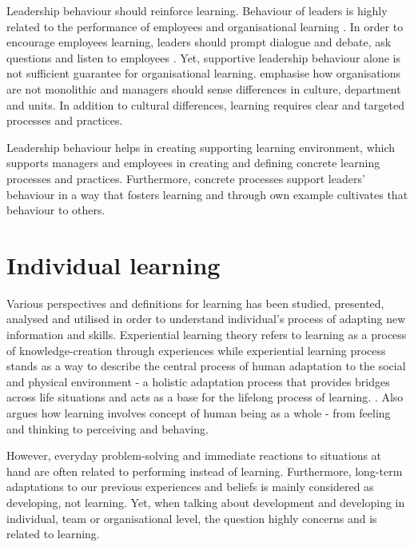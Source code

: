 Leadership behaviour should reinforce learning. Behaviour of leaders is highly related to the performance of employees \citep{kim2014blue} and organisational learning \citep{garvin2008yours}. In order to encourage employees learning, leaders should prompt dialogue and debate, ask questions and listen to employees \citep{kim2014blue,garvin2008yours}. Yet, supportive leadership behaviour alone is not sufficient guarantee for organisational learning. \citet{garvin2008yours}emphasise how organisations are not monolithic and managers should sense differences in culture, department and units. In addition to cultural differences, learning requires clear and targeted processes and practices. 

Leadership behaviour helps in creating supporting learning environment, which supports managers and employees in creating and defining concrete learning processes and practices. Furthermore, concrete processes support leaders' behaviour in a way that fosters learning and through own example cultivates that behaviour to others. \citep{garvin2008yours}

\section{Individual learning} \label{individual}
Various perspectives and definitions for learning has been studied, presented, analysed and utilised in order to understand individual's process of adapting new information and skills. Experiential learning theory refers to learning as a process of knowledge-creation through experiences while experiential learning process stands as a way to describe the central process of human adaptation to the social and physical environment - a holistic adaptation process that provides bridges across life situations and acts as a base for the lifelong process of learning. \citep{kolb1984experiential}. Also \citet{jung1923psychological} argues how learning involves concept of human being as a whole - from feeling and thinking to perceiving and behaving.

However, everyday problem-solving and immediate reactions to situations at hand are often related to performing instead of learning. Furthermore, long-term adaptations to our previous experiences and beliefs is mainly considered as developing, not learning. Yet, when talking about development and developing in individual, team or organisational level, the question highly concerns and is related to learning. \citep{kolb1984experiential}

